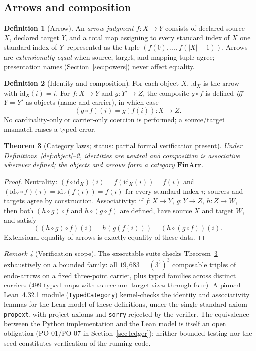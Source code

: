 \documentclass[11pt]{amsart}
\newtheorem{theorem}{Theorem}[section]
\theoremstyle{definition}
\newtheorem{definition}[theorem]{Definition}
\theoremstyle{remark}
\newtheorem{remark}[theorem]{Remark}
\newcommand{\id}{\mathrm{id}}
\newcommand{\FinArr}{\mathbf{FinArr}}
\begin{document}
\subsection{Arrows and composition}

\begin{definition}[Arrow]\label{def:arrow}
An \emph{arrow judgment} $f:X\to Y$ consists of declared source $X$, declared target $Y$, and a total map assigning to every standard index of $X$ one standard index of $Y$, represented as the tuple $(f(0),\dots,f(|X|-1))$. Arrows are \emph{extensionally equal} when source, target, and mapping tuple agree; presentation names (Section~\ref{sec:powers}) never affect equality.
\end{definition}

\begin{definition}[Identity and composition]\label{def:comp}
For each object $X$, $\id_X$ is the arrow with $\id_X(i)=i$. For $f:X\to Y$ and $g:Y'\to Z$, the composite $g\circ f$ is defined \emph{iff} $Y=Y'$ as objects (name and carrier), in which case
\[
(g\circ f)(i)=g(f(i)) : X\to Z .
\]
No cardinality-only or carrier-only coercion is performed; a source/target mismatch raises a typed error.
\end{definition}

\begin{theorem}[Category laws; \textnormal{status: partial formal verification present}]\label{thm:laws}
Under Definitions~\textup{\ref{def:object}--\ref{def:comp}}, identities are neutral and composition is associative wherever defined; the objects and arrows form a category $\FinArr$.
\end{theorem}

\begin{proof}
Neutrality: $(f\circ\id_X)(i)=f(\id_X(i))=f(i)$ and $(\id_Y\circ f)(i)=\id_Y(f(i))=f(i)$ for every standard index $i$; sources and targets agree by construction. Associativity: if $f:X\to Y$, $g:Y\to Z$, $h:Z\to W$, then both $(h\circ g)\circ f$ and $h\circ(g\circ f)$ are defined, have source $X$ and target $W$, and satisfy
\[
((h\circ g)\circ f)(i)=h(g(f(i)))=(h\circ(g\circ f))(i).
\]
Extensional equality of arrows is exactly equality of these data.
\end{proof}

\begin{remark}[Verification scope]\label{rem:lawsevidence}
The executable suite checks Theorem~\ref{thm:laws} exhaustively on a bounded family: all $19{,}683=(3^3)^3$ composable triples of endo-arrows on a fixed three-point carrier, plus typed families across distinct carriers ($499$ typed maps with source and target sizes through four). A pinned Lean~4.32.1 module (\texttt{TypedCategory}) kernel-checks the identity and associativity lemmas for the Lean model of these definitions, under the single standard axiom \texttt{propext}, with project axioms and \texttt{sorry} rejected by the verifier. The equivalence between the Python implementation and the Lean model is itself an open obligation (PO-01/PO-07 in Section~\ref{sec:ledger}); neither bounded testing nor the seed constitutes verification of the running code.
\end{remark}
\end{document}
